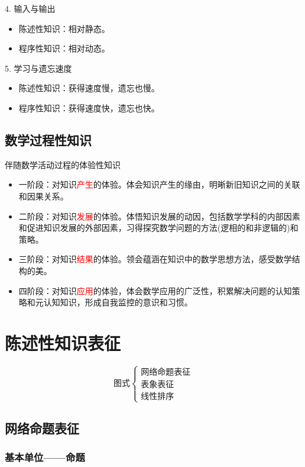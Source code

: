 4. 输入与输出
\begin{itemize}
    \item 陈述性知识：相对静态。
    \item 程序性知识：相对动态。
\end{itemize}

5. 学习与遗忘速度
\begin{itemize}
    \item 陈述性知识：获得速度慢，遗忘也慢。
    \item 程序性知识：获得速度快，遗忘也快。
\end{itemize}

\subsection{数学过程性知识}

伴随数学活动过程的体验性知识

\begin{itemize}
    \item 一阶段：对知识\textcolor{red}{产生}的体验。体会知识产生的缘由，明晰新旧知识之间的关联和因果关系。
    \item 二阶段：对知识\textcolor{red}{发展}的体验。体悟知识发展的动因，包括数学学科的内部因素和促进知识发展的外部因素，习得探究数学问题的方法(逻相的和非逻辑的)和策略。
    \item 三阶段：对知识\textcolor{red}{结果}的体验。领会蕴涵在知识中的数学思想方法，感受数学结构的美。
    \item 四阶段：对知识\textcolor{red}{应用}的体验，体会数学应用的广泛性，积累解决问题的认知策略和元认知知识，形成自我监控的意识和习惯。
\end{itemize}


\section{陈述性知识表征}

\[
\text{图式}
\begin{cases}
    \text{网络命题表征} \\
    \text{表象表征} \\
    \text{线性排序}
\end{cases}
\]

\subsection{网络命题表征}

\subsubsection*{基本单位——命题}

